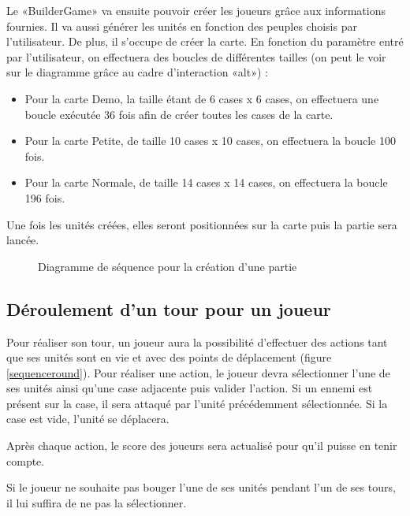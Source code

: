 \documentclass[a4paper]{article}
\begin{document}
Le «BuilderGame» va ensuite pouvoir créer les joueurs grâce aux informations fournies. Il va aussi générer les unités en fonction des peuples choisis par l’utilisateur.
De plus, il s’occupe de créer la carte. En fonction du paramètre entré par l’utilisateur, on effectuera des boucles de différentes tailles (on peut le voir sur le diagramme grâce au cadre d’interaction «alt») :
\begin{itemize}\renewcommand{\labelitemi}{$\bullet$}
	\item Pour la carte Demo, la taille étant de 6 cases x 6 cases, on effectuera une boucle exécutée 36 fois afin de créer toutes les cases de la carte.
	\item Pour la carte Petite, de taille 10 cases x 10 cases, on effectuera la boucle 100 fois.
  	\item Pour la carte Normale, de taille 14 cases x 14 cases, on effectuera la boucle 196 fois.
\end{itemize}
Une fois les unités créées, elles seront positionnées sur la carte puis la partie sera lancée.

\begin{figure}[!h] 
  \begin{center}
    \caption{Diagramme de séquence pour la création d'une partie} 
    \label{sequencecreation} 
  \end{center}
\end{figure}

\subsection{Déroulement d’un tour pour un joueur}

Pour réaliser son tour, un joueur aura la possibilité d’effectuer des actions tant que ses unités sont en vie et avec des points de déplacement (figure \ref{sequenceround}). Pour réaliser une action, le joueur devra sélectionner l’une de ses unités ainsi qu’une case adjacente puis valider l’action. Si un ennemi est présent sur la case, il sera attaqué par l’unité précédemment sélectionnée. Si la case est vide, l’unité se déplacera.

Après chaque action, le score des joueurs sera actualisé pour qu’il puisse en tenir compte.
    
Si le joueur ne souhaite pas bouger l’une de ses unités pendant l’un de ses tours, il lui suffira de ne pas la sélectionner.
\end{document}
